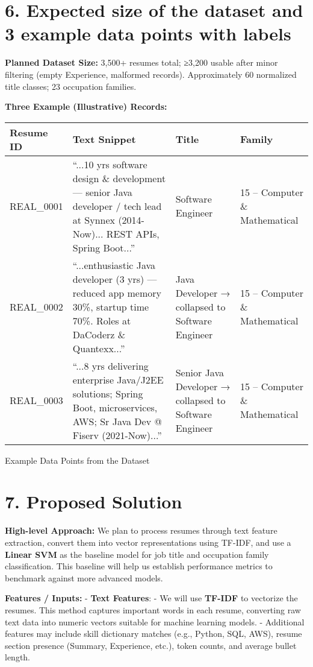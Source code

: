 \documentclass[12pt]{article}
\begin{document}
\section*{6. Expected size of the dataset and 3 example data points with labels}

\noindent \textbf{Planned Dataset Size:}  
3,500+ resumes total; ≥3,200 usable after minor filtering (empty Experience, malformed records). Approximately 60 normalized title classes; 23 occupation families.

\medskip
\noindent \textbf{Three Example (Illustrative) Records:}

\begin{center}
\begin{tabular}{|p{2.5cm}|p{5.5cm}|p{3.5cm}|p{3.5cm}|}
\hline
\textbf{Resume ID} & \textbf{Text Snippet} & \textbf{Title} & \textbf{Family} \\
\hline
REAL\_0001 & ``...10 yrs software design \& development — senior Java developer / tech lead at Synnex (2014-Now)... REST APIs, Spring Boot...'' & Software Engineer & 15 – Computer \& Mathematical \\
REAL\_0002 & ``...enthusiastic Java developer (3 yrs) — reduced app memory 30\%, startup time 70\%. Roles at DaCoderz \& Quantexx...'' & Java Developer → collapsed to Software Engineer & 15 – Computer \& Mathematical \\
REAL\_0003 & ``...8 yrs delivering enterprise Java/J2EE solutions; Spring Boot, microservices, AWS; Sr Java Dev @ Fiserv (2021-Now)...'' & Senior Java Developer → collapsed to Software Engineer & 15 – Computer \& Mathematical \\
\hline
\end{tabular}
\end{center}
\caption{Example Data Points from the Dataset}


\section*{7. Proposed Solution}

\noindent \textbf{High-level Approach:}  
We plan to process resumes through text feature extraction, convert them into vector representations using TF-IDF, and use a \textbf{Linear SVM} as the baseline model for job title and occupation family classification. This baseline will help us establish performance metrics to benchmark against more advanced models.

\medskip
\noindent \textbf{Features / Inputs:}  
- \textbf{Text Features}:  
    - We will use \textbf{TF-IDF} to vectorize the resumes. This method captures important words in each resume, converting raw text data into numeric vectors suitable for machine learning models.
    - Additional features may include skill dictionary matches (e.g., Python, SQL, AWS), resume section presence (Summary, Experience, etc.), token counts, and average bullet length.
    
\end{document}

